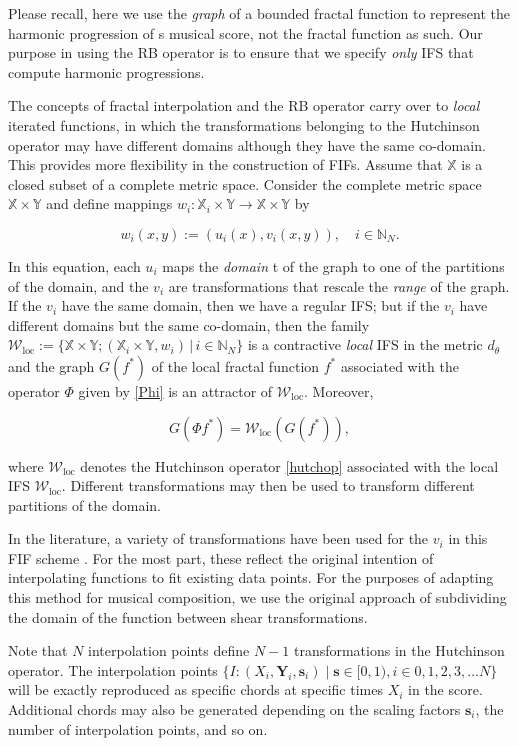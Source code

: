 \documentclass[english,11pt,letterpaper,onecolumn]{scrartcl}
\numberwithin{equation}{section}
\newcommand{\st}{\,|\,}
\newcommand{\N}{\mathbb{N}}
\newcommand{\X}{\mathbb{X}}
\newcommand{\Y}{\mathbb{Y}}
\newcommand{\cW}{\mathcal{W}}
\newcommand{\be}{\begin{equation}}
\newcommand{\ee}{\end{equation}}
\newcommand{\loc}{\mathrm{loc}}
\begin{document}
Please recall, here we use the \textit{graph} of a bounded fractal function to
represent the harmonic progression of s musical score, not the fractal function
as such. Our purpose in using the RB operator is to ensure that we specify
\textit{only} IFS that compute harmonic progressions.

The concepts of fractal interpolation and the RB operator carry over to
\textit{local} iterated functions, in which the transformations belonging to the
Hutchinson operator may have different domains although they have the same
co-domain. This provides more flexibility in the construction of FIFs. Assume
that $\X$ is a closed subset of a complete metric space. Consider the complete
metric space $\X\times\Y$ and define mappings $w_i:\X_i\times\Y\to\X\times\Y$ by

\be\label{IfsForFif}
w_i (x, y) := (u_i (x), v_i (x,y)), \quad i\in \N_N.
\ee

In this equation, each $u_i$ maps the \emph{domain} t of the graph to one of the
partitions of the domain, and the $v_i$ are transformations that rescale
the \emph{range} of the graph. If the $v_i$ have the same domain, then we have a
regular IFS; but if the $v_i$ have different domains but the same co-domain,
then the family $\cW_\loc := \{\X\times\Y; (\X_i\times\Y, w_i)\st i\in \N_N\}$
is a contractive \textit{local} IFS in the metric $d_\theta$ and the graph
$G(f^*)$ of the local fractal function $f^*$ associated with the operator $\Phi$
given by \eqref{Phi} is an attractor of $\cW_\loc$. Moreover,

\be\label{GW}
G(\Phi f^*) = \cW_\loc (G(f^*)),
\ee

\noindent where $\cW_\loc$ denotes the Hutchinson operator \eqref{hutchop}
associated with the local IFS $\cW_\loc$. Different transformations may then be
used to transform different partitions of the domain.

In the literature, a variety of transformations have been used for the $v_i$ in
this FIF scheme \cite{Navascues:2014}. For the most part, these reflect the original intention of
interpolating functions to fit existing data points. For the purposes of
adapting this method for musical composition, we use the original approach of
subdividing the domain of the function between shear transformations.

Note that $N$ interpolation points define $N-1$ transformations in the
Hutchinson operator. The interpolation points $\{I : (X_i, \mathbf{Y}_i,
\mathbf{s}_i) \mid \mathbf{s} \in [0, 1), i \in 0, 1, 2, 3, \dots N\}$ will be
exactly reproduced as specific chords at specific times $X_i$ in the score.
Additional chords may also be generated depending on the scaling factors
$\mathbf{s}_i$, the number of interpolation points, and so on.
\end{document}
